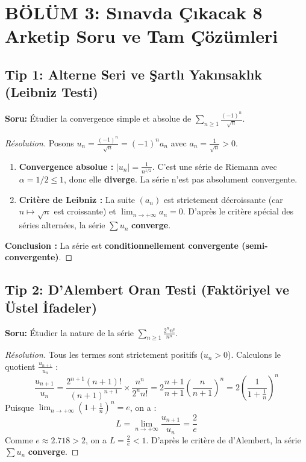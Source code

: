 \documentclass[11pt,a4paper]{article}
\begin{document}
\newpage

\section*{BÖLÜM 3: Sınavda Çıkacak 8 Arketip Soru ve Tam Çözümleri}

\subsection*{Tip 1: Alterne Seri ve Şartlı Yakınsaklık (Leibniz Testi)}
\textbf{Soru:} Étudier la convergence simple et absolue de $\sum_{n \ge 1} \frac{(-1)^n}{\sqrt{n}}$.
\begin{proof}[Résolution]
Posons $u_n = \frac{(-1)^n}{\sqrt{n}} = (-1)^n a_n$ avec $a_n = \frac{1}{\sqrt{n}} > 0$.
\begin{enumerate}
    \item \textbf{Convergence absolue :} $|u_n| = \frac{1}{n^{1/2}}$. C'est une série de Riemann avec $\alpha = 1/2 \le 1$, donc elle \textbf{diverge}. La série n'est pas absolument convergente.
    \item \textbf{Critère de Leibniz :} La suite $(a_n)$ est strictement décroissante (car $n \mapsto \sqrt{n}$ est croissante) et $\lim_{n \to +\infty} a_n = 0$. D'après le critère spécial des séries alternées, la série $\sum u_n$ \textbf{converge}.
\end{enumerate}
\textbf{Conclusion :} La série est \textbf{conditionnellement convergente (semi-convergente)}.
\end{proof}

\subsection*{Tip 2: D'Alembert Oran Testi (Faktöriyel ve Üstel İfadeler)}
\textbf{Soru:} Étudier la nature de la série $\sum_{n \ge 1} \frac{2^n n!}{n^n}$.
\begin{proof}[Résolution]
Tous les termes sont strictement positifs ($u_n > 0$). Calculons le quotient $\frac{u_{n+1}}{u_n}$ :
\[ \frac{u_{n+1}}{u_n} = \frac{2^{n+1} (n+1)!}{(n+1)^{n+1}} \times \frac{n^n}{2^n n!} = 2 \frac{n+1}{n+1} \left(\frac{n}{n+1}\right)^n = 2 \left( \frac{1}{1 + \frac{1}{n}} \right)^n \]
Puisque $\lim_{n \to +\infty} \left(1 + \frac{1}{n}\right)^n = e$, on a :
\[ L = \lim_{n \to +\infty} \frac{u_{n+1}}{u_n} = \frac{2}{e} \]
Comme $e \approx 2.718 > 2$, on a $L = \frac{2}{e} < 1$. D'après le critère de d'Alembert, la série $\sum u_n$ \textbf{converge}.
\end{proof}
\end{document}
